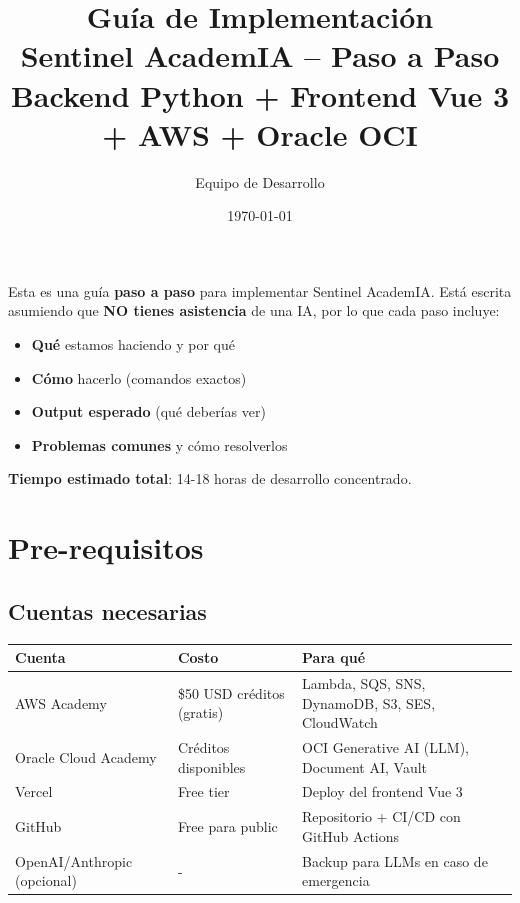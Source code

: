 \documentclass[11pt,a4paper]{article}
\title{
    \vspace{-1.5cm}
    {\Huge\bfseries\color{primary} Gu\'ia de Implementaci\'on}\\[0.4cm]
    {\Large Sentinel AcademIA -- Paso a Paso}\\[0.6cm]
    {\normalsize Backend Python + Frontend Vue 3 + AWS + Oracle OCI}
}
\author{Equipo de Desarrollo}
\date{\today}
\begin{document}
\maketitle
\thispagestyle{fancy}

\begin{tcolorbox}[colback=codebg, colframe=primary, title=\textbf{Sobre esta gu\'ia}]
Esta es una gu\'ia \textbf{paso a paso} para implementar Sentinel AcademIA. Est\'a escrita asumiendo que \textbf{NO tienes asistencia} de una IA, por lo que cada paso incluye:

\begin{itemize}[leftmargin=*]
    \item \textbf{Qu\'e} estamos haciendo y por qu\'e
    \item \textbf{C\'omo} hacerlo (comandos exactos)
    \item \textbf{Output esperado} (qu\'e deber\'ias ver)
    \item \textbf{Problemas comunes} y c\'omo resolverlos
\end{itemize}

\textbf{Tiempo estimado total}: 14-18 horas de desarrollo concentrado.
\end{tcolorbox}

\tableofcontents
\newpage

\section{Pre-requisitos}

\subsection{Cuentas necesarias}

\begin{longtable}{|p{4cm}|p{4cm}|p{6cm}|}
\hline
\rowcolor{primary!20}
\textbf{Cuenta} & \textbf{Costo} & \textbf{Para qu\'e} \\
\hline
\endhead
AWS Academy & \$50 USD cr\'editos (gratis) & Lambda, SQS, SNS, DynamoDB, S3, SES, CloudWatch \\
\hline
Oracle Cloud Academy & Cr\'editos disponibles & OCI Generative AI (LLM), Document AI, Vault \\
\hline
Vercel & Free tier & Deploy del frontend Vue 3 \\
\hline
GitHub & Free para public & Repositorio + CI/CD con GitHub Actions \\
\hline
OpenAI/Anthropic (opcional) & - & Backup para LLMs en caso de emergencia \\
\hline
\end{longtable}
\end{document}
